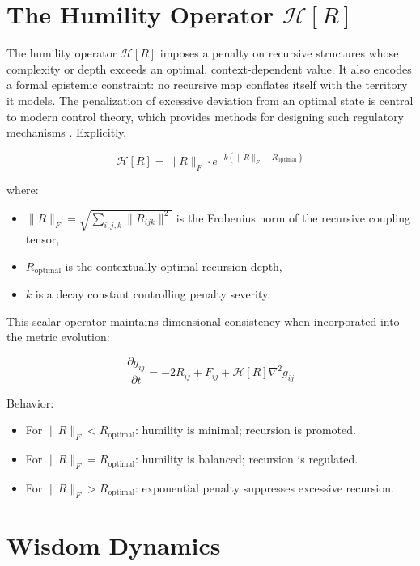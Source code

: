 \section{The Humility Operator \(\mathcal{H}[R]\)}

The humility operator \(\mathcal{H}[R]\) imposes a penalty on recursive structures whose complexity or depth exceeds an optimal, context-dependent value. It also encodes a formal epistemic constraint: no recursive map conflates itself with the territory it models. The penalization of excessive deviation from an optimal state is central to modern control theory, which provides methods for designing such regulatory mechanisms \autocite{Kalman1960, AndersonMoore1990}. Explicitly,

\begin{equation}
\mathcal{H}[R] = \|R\|_F \cdot e^{-k(\|R\|_F - R_{\text{optimal}})}
\end{equation}

where:
\begin{itemize}
    \item \(\|R\|_F = \sqrt{\sum_{i, j, k} \|R_{ijk}\|^2}\) is the Frobenius norm of the recursive coupling tensor,
    \item \(R_{\text{optimal}}\) is the contextually optimal recursion depth,
    \item \(k\) is a decay constant controlling penalty severity.
\end{itemize}

This scalar operator maintains dimensional consistency when incorporated into the metric evolution:

\begin{equation}
\frac{\partial g_{ij}}{\partial t} = -2 R_{ij} + F_{ij} + \mathcal{H}[R] \nabla^2 g_{ij}
\end{equation}

Behavior:
\begin{itemize}
    \item For \(\|R\|_F < R_{\text{optimal}}\): humility is minimal; recursion is promoted.
    \item For \(\|R\|_F = R_{\text{optimal}}\): humility is balanced; recursion is regulated.
    \item For \(\|R\|_F > R_{\text{optimal}}\): exponential penalty suppresses excessive recursion.
\end{itemize}

\section{Wisdom Dynamics}

